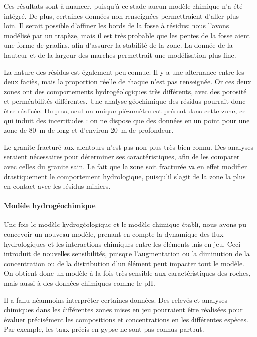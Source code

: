 \documentclass{article}
\begin{document}
Ces résultats sont à nuancer, puisqu’à ce stade aucun modèle chimique n’a été intégré. De plus, certaines données non renseignées permettraient d’aller plus loin. Il serait possible d’affiner les bords de la fosse à résidus: nous l’avons modélisé par un trapèze, mais il est très probable que les pentes de la fosse aient une forme de gradins, afin d’assurer la stabilité de la zone. La donnée de la hauteur et de la largeur des marches permettrait une modélisation plus fine.

La nature des résidus est également peu connue. Il y a une alternance entre les deux faciès, mais la proportion réelle de chaque n’est pas renseignée. Or ces deux zones ont des comportements hydrogéologiques très différents, avec des porosité et perméabilités différentes. Une analyse géochimique des résidus pourrait donc être réalisée. De plus, seul un unique piézomètre est présent dans cette zone, ce qui induit des incertitudes : on ne dispose que des données en un point pour une zone de 80~m de long et d’environ 20~m de profondeur.

Le granite fracturé aux alentours n’est pas non plus très bien connu. Des analyses seraient nécessaires pour déterminer ses caractéristiques, afin de les comparer avec celles du granite sain. Le fait que la zone soit fracturée va en effet modifier drastiquement le comportement hydrologique, puisqu’il s’agit de la zone la plus en contact avec les résidus miniers.

\paragraph{Modèle hydrogéochimique}

Une fois le modèle hydrogéologique et le modèle chimique établi, nous avons pu concevoir un nouveau modèle, prenant en compte la dynamique des flux hydrologiques et les interactions chimiques entre les éléments mis en jeu. Ceci introduit de nouvelles sensibilités, puisque l’augmentation ou la diminution de la concentration ou de la distribution d’un élément peut impacter tout le modèle. On obtient donc un modèle à la fois très sensible aux caractéristiques des roches, mais aussi à des données chimiques comme le pH.

Il a fallu néanmoins interpréter certaines données. Des relevés et analyses chimiques dans les différentes zones mises en jeu pourraient être réalisées pour évaluer précisément les compositions et concentrations en les différentes espèces. Par exemple, les taux précis en gypse ne sont pas connus partout.
\end{document}
